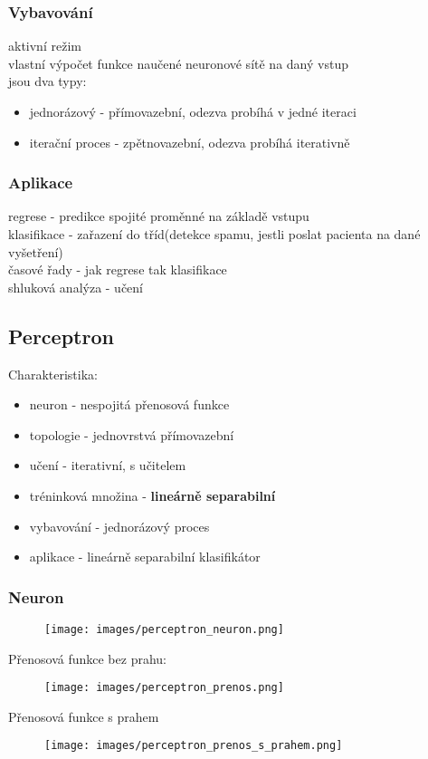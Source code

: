 \subsubsection{Vybavování}
aktivní režim\\
vlastní výpočet funkce naučené neuronové sítě na daný vstup\\
jsou dva typy:
\begin{itemize}
    \item jednorázový - přímovazební, odezva probíhá v jedné iteraci
    \item iterační proces - zpětnovazební, odezva probíhá iterativně
\end{itemize}

\subsubsection{Aplikace}
regrese - predikce spojité proměnné na základě vstupu\\
klasifikace - zařazení do tříd(detekce spamu, jestli poslat pacienta na dané vyšetření)\\
časové řady - jak regrese tak klasifikace\\
shluková analýza - učení

\subsection{Perceptron}
Charakteristika:
\begin{itemize}
    \item neuron - nespojitá přenosová funkce
    \item topologie - jednovrstvá přímovazební
    \item učení - iterativní, s učitelem
    \item tréninková množina - \textbf{lineárně separabilní}
    \item vybavování - jednorázový proces
    \item aplikace - lineárně separabilní klasifikátor
\end{itemize}
\subsubsection{Neuron}
\begin{figure}[H]
    \texttt{[image: images/perceptron\_neuron.png]}
\end{figure}
\newpage
Přenosová funkce bez prahu:
\begin{figure}[H]
    \texttt{[image: images/perceptron\_prenos.png]}
\end{figure}
Přenosová funkce s prahem
\begin{figure}[H]
    \texttt{[image: images/perceptron\_prenos\_s\_prahem.png]}
\end{figure}

